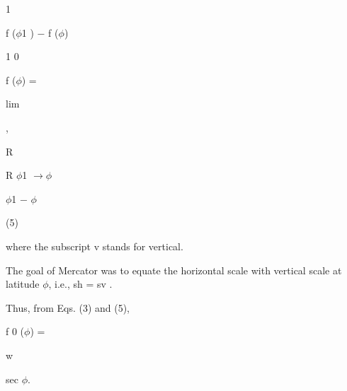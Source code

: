 \documentclass[a4paper,portrait,12pt]{article}
\begin{document}
1


\begin{flushleft}
f ($\phi$1 ) $-$ f ($\phi$)
\end{flushleft}


1 0


\begin{flushleft}
f ($\phi$) =
\end{flushleft}


\begin{flushleft}
lim
\end{flushleft}


,


\begin{flushleft}
R
\end{flushleft}


\begin{flushleft}
R $\phi$1 $\rightarrow$$\phi$
\end{flushleft}


\begin{flushleft}
$\phi$1 $-$ $\phi$
\end{flushleft}





(5)





\begin{flushleft}
where the subscript v stands for vertical.
\end{flushleft}


\begin{flushleft}
The goal of Mercator was to equate the horizontal scale with vertical scale at latitude $\phi$, i.e., sh = sv .
\end{flushleft}


\begin{flushleft}
Thus, from Eqs. (3) and (5),
\end{flushleft}


\begin{flushleft}
f 0 ($\phi$) =
\end{flushleft}





\begin{flushleft}
w
\end{flushleft}


\begin{flushleft}
sec $\phi$.
\end{flushleft}
\end{document}
